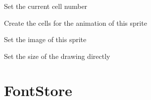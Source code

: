 \documentclass[letterpaper,10pt,english]{sphinxmanual}
\begin{document}
\begin{fulllineitems}

\begin{fulllineitems}
\label{visual:serge.visual.Sprite.setCell}
Set the current cell number

\end{fulllineitems}


\begin{fulllineitems}
\label{visual:serge.visual.Sprite.setCells}
Create the cells for the animation of this sprite

\end{fulllineitems}


\begin{fulllineitems}
\label{visual:serge.visual.Sprite.setImage}
Set the image of this sprite

\end{fulllineitems}


\begin{fulllineitems}
\label{visual:serge.visual.Sprite.setSize}
Set the size of the drawing directly

\end{fulllineitems}


\end{fulllineitems}



\section{FontStore}
\label{visual:fontstore}
\end{document}
